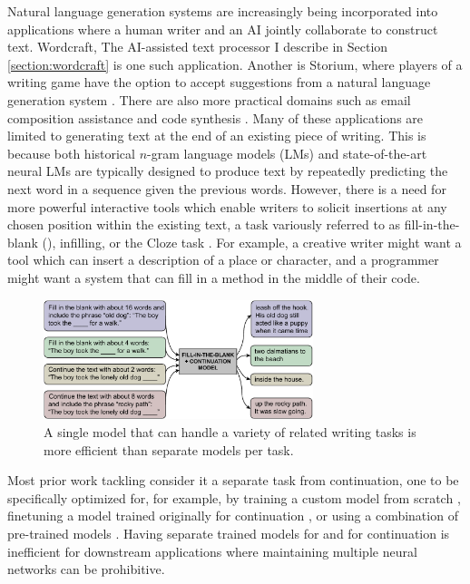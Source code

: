 Natural language generation systems are increasingly being incorporated into applications where a human writer and an AI jointly collaborate to construct text.
Wordcraft, The AI-assisted text processor I describe in Section \ref{section:wordcraft} is one such application.
Another is Storium, where players of a writing game have the option to accept suggestions from a natural language generation system \citep{akoury2020storium}.
There are also more practical domains such as email composition assistance and code synthesis \citep{buschek2021impact,wu2018smart,austin2021program}.
Many of these applications are limited to generating text at the end of an existing piece of writing.
This is because
both historical $n$-gram language models (LMs) and state-of-the-art neural LMs
are typically designed to produce text by repeatedly predicting the next word in a sequence given the previous words.
However, there is a need for more powerful interactive tools which enable writers to solicit insertions at any chosen position within the existing text, a task variously referred to as fill-in-the-blank (\FitB), infilling, or the Cloze task \citep{taylor1953cloze}.
For example, a creative writer might want a tool which can insert a description of a place or character, and a programmer might want a system that can fill in a method in the middle of their code.

\begin{figure}[tbp]
    \centering
    \includegraphics[width=0.7\textwidth]{figures/leading_figure.pdf}
    \caption{A single model that can handle a variety of related writing tasks is more efficient than separate models per task.}
    \label{fig:leading_figure}
\end{figure}

Most prior work tackling \FitB{} consider it a separate task from continuation, one to be specifically optimized for, for example, by training a custom model from scratch \citep{ippolito2019unsupervised,zhu2019text,mori2020finding}, finetuning a model trained originally for continuation \citep{donahue2020enabling}, or using a combination of pre-trained models \citep{huang2020inset}.
Having separate trained models for \FitB{} and for continuation is inefficient for downstream applications where maintaining multiple neural networks can be prohibitive.

